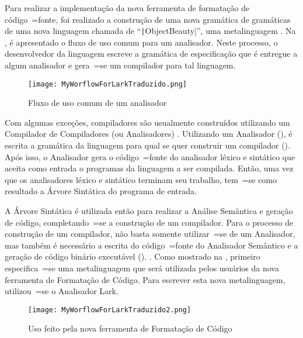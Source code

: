 Para realizar a implementação da nova ferramenta de formatação de código~=fonte,
foi realizado a construção de uma nova gramática de gramáticas de uma nova linguagem chamada de ``\texttt|ObjectBeauty|'',
uma metalinguagem \cite{compilersCompilerMetaLanguage}.
Na ,
é apresentado o fluxo de uso comum para um analisador.
Neste processo,
o desenvolvedor da linguagem escreve a gramática de especificação que é entregue a algum analisador e
gera~=se um compilador para tal linguagem.
\begin{figure}[!htb]
\caption{Fluxo de uso comum de um analisador}
\label{figure:MyWorflowForLarkTraduzido}
\centering
\texttt{[image: MyWorflowForLarkTraduzido.png]}
\end{figure}

Com algumas exceções,
compiladores são usualmente construídos utilizando um Compilador de Compiladores (ou Analisadores) \cite{compilersCompilerMetaLanguage}.
Utilizando um Analisador (),
é escrita a gramática da linguagem para qual se quer construir um compilador ().
Após isso,
o Analisador gera o código~=fonte do analisador léxico e
sintático que aceita como entrada o programas da linguagem a ser compilada.
Então,
uma vez que os analisadores léxico e
sintático terminam seu trabalho,
tem~=se como resultado a Árvore Sintática do programa de entrada.

A Árvore Sintática é utilizada então para realizar a Análise Semântica e
geração de código,
completando~=se a construção de um compilador.
Para o processo de construção de um compilador,
não basta somente utilizar~=se de um Analisador,
mas também é necessário a escrita do código~=fonte do Analisador Semântico e
a geração de código binário executável ().
.
Como mostrado na ,
primeiro especifica~=se uma metalinguagem que será utilizada pelos usuários da nova ferramenta de Formatação de Código.
Para escrever esta nova metalinguagem,
utilizou~=se o Analisador Lark.
\begin{figure}[!htb]
\caption{Uso feito pela nova ferramenta de Formatação de Código}
\label{figure:MyWorflowForLarkTraduzido2}
\centering
\texttt{[image: MyWorflowForLarkTraduzido2.png]}
\end{figure}

